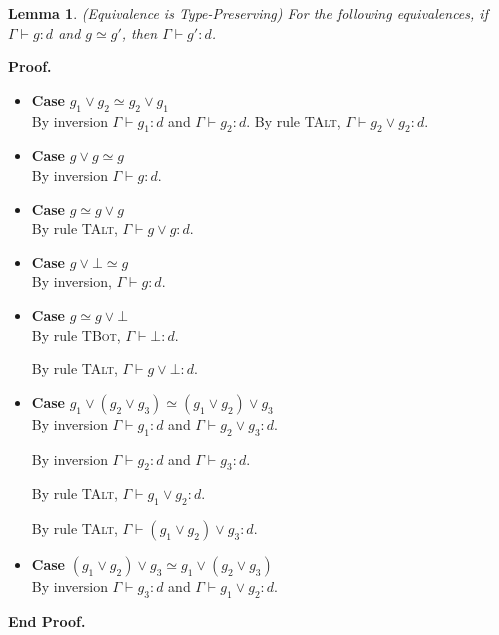 \documentclass{article}
\newcommand{\judgebalance}[3][\Gamma]{{#1} \vdash {#2} : {#3}}
\newtheorem{lemma}{Lemma}
\newenvironment{proof}{\noindent\textbf{Proof.}}{\noindent\textbf{End Proof.}}
\newenvironment{caseblock}{\begin{itemize}}{\end{itemize}}
\newenvironment{case}[1]{\item \textbf{Case} {#1}\\}{}
\begin{document}
\begin{lemma}{(Equivalence is Type-Preserving)}
For the following equivalences, if $\judgebalance{g}{d}$ and $g \simeq g'$, then $\judgebalance{g'}{d}$.   
\end{lemma}

\begin{proof}
  \begin{caseblock}
    \begin{case}{$g_1 \vee g_2 \simeq g_2 \vee g_1$}
      By inversion $\judgebalance{g_1}{d}$ and $\judgebalance{g_2}{d}$. By 
      rule \textsc{TAlt}, $\judgebalance{g_2 \vee g_2}{d}$. 
    \end{case}

    \begin{case}{$g \vee g \simeq g$}
      By inversion $\judgebalance{g}{d}$. 
    \end{case}

    \begin{case}{$g \simeq g \vee g$}
      By rule \textsc{TAlt}, $\judgebalance{g \vee g}{d}$. 
    \end{case}

    \begin{case}{$g \vee \bot \simeq g$}
      By inversion, $\judgebalance{g}{d}$. 
    \end{case}

    \begin{case}{$g \simeq g \vee \bot$}
      By rule \textsc{TBot}, $\judgebalance{\bot}{d}$. 

      By rule \textsc{TAlt}, $\judgebalance{g \vee \bot}{d}$. 
    \end{case}

    \begin{case}{$g_1 \vee (g_2 \vee g_3) \simeq (g_1 \vee g_2) \vee g_3$}
      By inversion $\judgebalance{g_1}{d}$ and $\judgebalance{g_2 \vee g_3}{d}$. 

      By inversion $\judgebalance{g_2}{d}$ and $\judgebalance{g_3}{d}$.

      By rule \textsc{TAlt}, $\judgebalance{g_1 \vee g_2}{d}$.
      
      By rule \textsc{TAlt}, $\judgebalance{(g_1 \vee g_2) \vee g_3}{d}$. 
    \end{case}

    \begin{case}{$(g_1 \vee g_2) \vee g_3 \simeq g_1 \vee (g_2 \vee g_3)$}
      By inversion $\judgebalance{g_3}{d}$ and $\judgebalance{g_1 \vee g_2}{d}$. 


\end{case}
\end{caseblock}
\end{proof}
\end{document}
